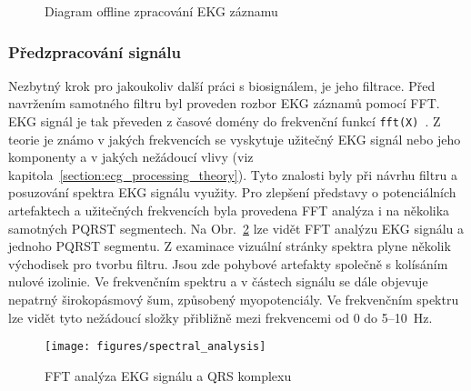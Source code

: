 \begin{figure}[H]
    \centering
    \caption{Diagram offline zpracování EKG záznamu}
    \label{fig:diagram_offline_processing}
\end{figure}

\subsubsection{Předzpracování signálu}
\label{section:preprocessing}
Nezbytný krok pro jakoukoliv další práci s biosignálem, je jeho filtrace. Před
navržením samotného filtru byl proveden rozbor EKG záznamů pomocí FFT. EKG
signál je tak převeden z časové domény do frekvenční funkcí
\texttt{fft(X)}~\cite{matlabFFT}. Z teorie je známo v jakých frekvencích se
vyskytuje užitečný EKG signál nebo jeho komponenty a v jakých nežádoucí vlivy
(viz kapitola~\ref{section:ecg_processing_theory}). Tyto znalosti byly při
návrhu filtru a posuzování spektra EKG signálu využity. Pro zlepšení představy o
potenciálních artefaktech a užitečných frekvencích byla provedena FFT analýza i
na několika samotných PQRST segmentech. Na Obr.~\ref{fig:spectral_analysis} lze
vidět FFT analýzu EKG signálu a jednoho PQRST segmentu. Z examinace vizuální
stránky spektra plyne několik východisek pro tvorbu filtru. Jsou zde pohybové
artefakty společně s kolísáním nulové izolinie. Ve frekvenčním spektru a v
částech signálu se dále objevuje nepatrný širokopásmový šum, způsobený
myopotenciály. Ve frekvenčním spektru lze vidět tyto nežádoucí složky přibližně
mezi frekvencemi od 0 do 5--10~\si\Hz.

\begin{figure}[h]
    \begin{center}
        \texttt{[image: figures/spectral\_analysis]}
        \caption{FFT analýza EKG signálu a QRS komplexu}
        \label{fig:spectral_analysis}
    \end{center}
\end{figure}

